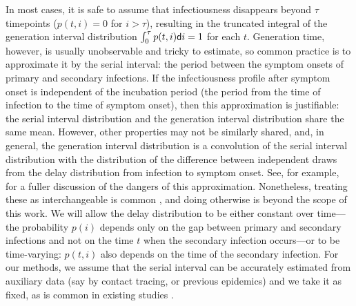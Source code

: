 In most cases, it is safe to assume that infectiousness disappears beyond $\tau$
timepoints ($p(t,i) = 0$ for $i > \tau$), resulting in the truncated integral of
the generation interval distribution $\int_0^\tau p(t,i)\mathsf{d} i = 1$ for each
$t$. Generation time, however, is usually unobservable and tricky to estimate,
so common practice is to approximate it by the serial interval: the period
between the symptom onsets of primary and secondary infections. If the
infectiousness profile after symptom onset is independent of the incubation
period (the period from the time of infection to the time of symptom onset),
then this approximation is justifiable: the serial interval distribution and the
generation interval distribution share the same mean. However, other properties
may not be similarly shared, and, in general, the generation interval
distribution is a convolution of the serial interval distribution with the
distribution of the difference between independent draws from the delay
distribution from infection to symptom onset. See, for example,
\cite{gostic2020practical} for a fuller discussion of the dangers of this
approximation. Nonetheless, treating these as interchangeable is common
\citep{cori2013new,park2021forward}, and doing otherwise is beyond the scope of
this work. We will allow the delay distribution to be either constant over time---the probability $p(i)$ depends only on the gap between primary and
secondary infections and not on the time $t$ when the secondary infection
occurs---or to be time-varying: $p(t,i)$ also depends on the time of the
secondary infection. For our methods, we assume that the serial interval can be
accurately estimated from auxiliary data (say by contact tracing, or previous
epidemics) and we take it as fixed, as is common in existing studies
\citep{cori2013new,abry2020spatial,pascal2022nonsmooth}.


